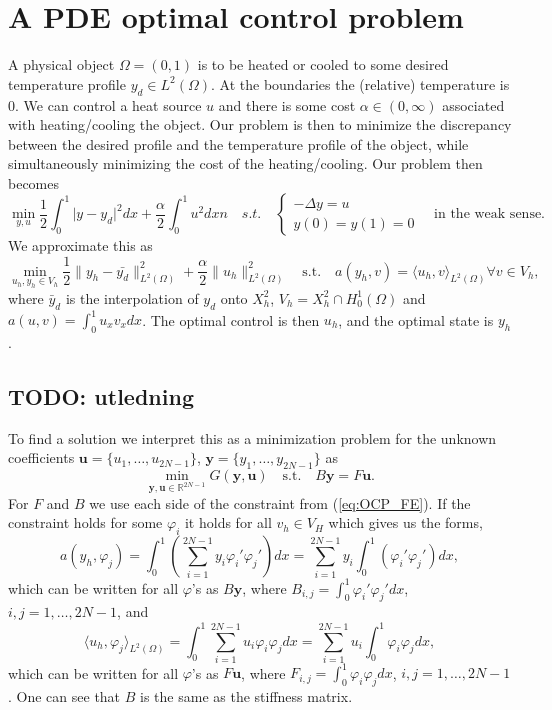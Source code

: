 \section{A PDE optimal control problem}
A physical object $\Omega = (0, 1)$ is to be heated or cooled to some desired temperature profile $y_d \in L^2 (\Omega)$. At the boundaries the (relative) temperature is $0$. 
We can control a heat source $u$ and there is some cost $\alpha \in (0, \infty)$ associated with heating/cooling the object.
Our problem is then to minimize the discrepancy between the desired profile and the temperature profile of the object, while simultaneously minimizing the cost of the heating/cooling.
Our problem then becomes
\begin{equation}
    \label{eq:OCP}
    \min_{y, u} \frac{1}{2} \int_0^1 \lvert y - y_d \rvert^2 dx + \frac{\alpha}{2}\int_0^1u^2 dxn
    \quad s.t. \quad \begin{cases}
       -\Delta y = u \\
       y(0) = y(1) = 0
    \end{cases} 
    \quad \text{in the weak sense.}
\end{equation}
We approximate this as 
\begin{equation}
    \label{eq:OCP_FE}
    \min_{u_h, y_h \in V_h} \frac{1}{2} \lVert y_h - \bar{y_d} \rVert_ {L^2(\Omega)}^2 + \frac{\alpha}{2} \lVert u_h \rVert_{L^2(\Omega)}^2
    \quad \text{s.t.} \quad a(y_h, v) = \langle u_h, v \rangle_{L^2(\Omega)} \forall v \in V_h,
\end{equation}
where $\bar{y}_d$ is the interpolation of $y_d$ onto $X_h^2$, $V_h = X_h^2 \cap H_0^1 (\Omega)$ and $a(u, v) = \int_0^1 u_x v_x dx$.
The optimal control is then $u_h$, and the optimal state is $y_h$.
\subsection{TODO: utledning}
To find a solution we interpret this as a minimization problem for the unknown coefficients $\mathbf{u} = \{u_1, \dots, u_{2N-1} \}$, $\mathbf{y} = \{y_1, \dots, y_{2N-1} \}$ as
\begin{equation}
    \label{eq:OCP_coeff}
    \min_{\mathbf{y,u} \in \mathds{R}^{2N-1}} G(\mathbf{y, u}) \quad \text{s.t.} \quad B\mathbf{y} = F\mathbf{u}.
\end{equation}
For $F$ and $B$ we use each side of the constraint from (\ref{eq:OCP_FE}). If the constraint holds for some $\varphi_i$ it holds for all $v_h\in V_H$ which gives us the forms,
$$a(y_h, \varphi_j) = \int_0^1 \left( \sum_{i=1}^{2N-1} y_i \varphi_i' \varphi_j' \right)dx =\sum_{i=1}^{2N-1} y_i\int_0^1 \left( \varphi_i' \varphi_j' \right)dx,$$
which can be written for all $\varphi$'s as $B\mathbf{y}$, where $B_{i,j} = \int_0^1 \varphi_i' \varphi_j'dx$,  $i,j = 1, \dots, 2N-1$, and  
$$\langle u_h, \varphi_j \rangle_{L^2(\Omega)} = \int_0^1 \sum_{i=1}^{2N-1} u_i \varphi_i \varphi_j dx =\sum_{i=1}^{2N-1} u_i \int_0^1  \varphi_i \varphi_j dx,$$
which can be written for all $\varphi$'s as $F\mathbf{u}$, where $F_{i,j}=\int_0^1  \varphi_i \varphi_j dx$, $i,j = 1, \dots, 2N-1$.
One can see that $B$ is the same as the stiffness matrix.


